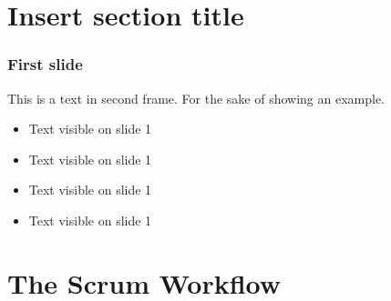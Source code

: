 \documentclass{beamer}
\begin{document}
\section{Insert section title}

\begin{frame}
    \frametitle{First slide}
    
    This is a text in second frame. 
    For the sake of showing an example.
    
    \begin{itemize}
     \item<1-> Text visible on slide 1
     \item<2-> Text visible on slide 1
     \item<3> Text visible on slide 1
     \item<4-> Text visible on slide 1
    \end{itemize}
    
\end{frame}

\section{The Scrum Workflow}
\end{document}

